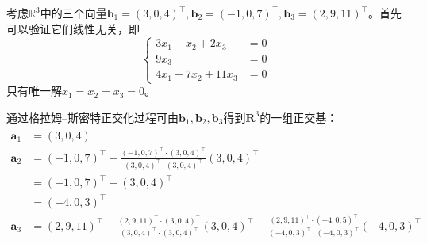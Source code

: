 \documentclass[../main.tex]{subfiles}
\begin{document}
\begin{example}
    考虑$\mathbb{R}^3$中的三个向量$\mathbf{b}_1=\left(3,0,4\right)^\intercal,\mathbf{b}_2=\left(-1,0,7\right)^\intercal,\mathbf{b}_3=\left(2,9,11\right)^\intercal$。首先可以验证它们线性无关，即
    \[
        \left\{\begin{array}{rl}
            3x_1-x_2+2x_3   & =0 \\
            9x_3            & =0 \\
            4x_1+7x_2+11x_3 & =0
        \end{array}\right.
    \]
    只有唯一解$x_1=x_2=x_3=0$。

    通过格拉姆--斯密特正交化过程可由$\mathbf{b}_1,\mathbf{b}_2,\mathbf{b}_3$得到$\mathbf{R}^3$的一组正交基：
    \begin{align*}
        \mathbf{a}_1 & =\left(3,0,4\right)^\intercal                                                                                                                                                                                                                                                                                                                                        \\
        \mathbf{a}_2 & =\left(-1,0,7\right)^\intercal-\frac{\left(-1,0,7\right)^\intercal\cdot\left(3,0,4\right)^\intercal}{\left(3,0,4\right)^\intercal\cdot\left(3,0,4\right)^\intercal}\left(3,0,4\right)^\intercal                                                                                                                                                                      \\
                     & =\left(-1,0,7\right)^\intercal-\left(3,0,4\right)^\intercal                                                                                                                                                                                                                                                                                                          \\
                     & =\left(-4,0,3\right)^\intercal                                                                                                                                                                                                                                                                                                                                       \\
        \mathbf{a}_3 & =\left(2,9,11\right)^\intercal-\frac{\left(2,9,11\right)^\intercal\cdot\left(3,0,4\right)^\intercal}{\left(3,0,4\right)^\intercal\cdot\left(3,0,4\right)^\intercal}\left(3,0,4\right)^\intercal-\frac{\left(2,9,11\right)^\intercal\cdot\left(-4,0,5\right)^\intercal}{\left(-4,0,3\right)^\intercal\cdot\left(-4,0,3\right)^\intercal}\left(-4,0,3\right)^\intercal \\

\end{align*}
\end{example}
\end{document}
